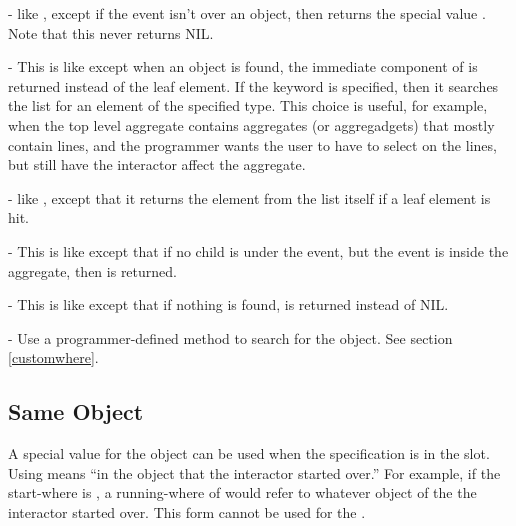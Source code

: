 \begin{description}
 - like ,
except if the event isn't over an object, then returns the special value .
Note that this never returns NIL.

 -
This is like  except when an object is found, the
immediate component of  is returned instead of the leaf element.
If the  keyword is specified, then it searches
the list for an element of the specified type.  This choice is useful, for
example, when the top level aggregate contains aggregates (or aggregadgets)
that mostly contain lines, and the programmer wants the user to have to
select on the lines, but still have the interactor affect the aggregate.

 - like
, except that it returns the element from the list
itself if a leaf element is hit.

 -
This is like  except that if no child is
under the event, but the event is inside the aggregate, then  is
returned.

 -
This is like  except that if nothing is
found,  is returned instead of NIL.

\item[]  -
Use a programmer-defined method to search for the object.  See section
\ref{customwhere}.

\end{description}

\subsection{Same Object}
A special value for the object can be used when the specification is in the
 slot.  Using \pr{*} means ``in the object
that the interactor started over.''  For example, if the start-where is
, a running-where of  would refer to
whatever object of the  the interactor started over.  This \pr{*}
form cannot be used for the .

